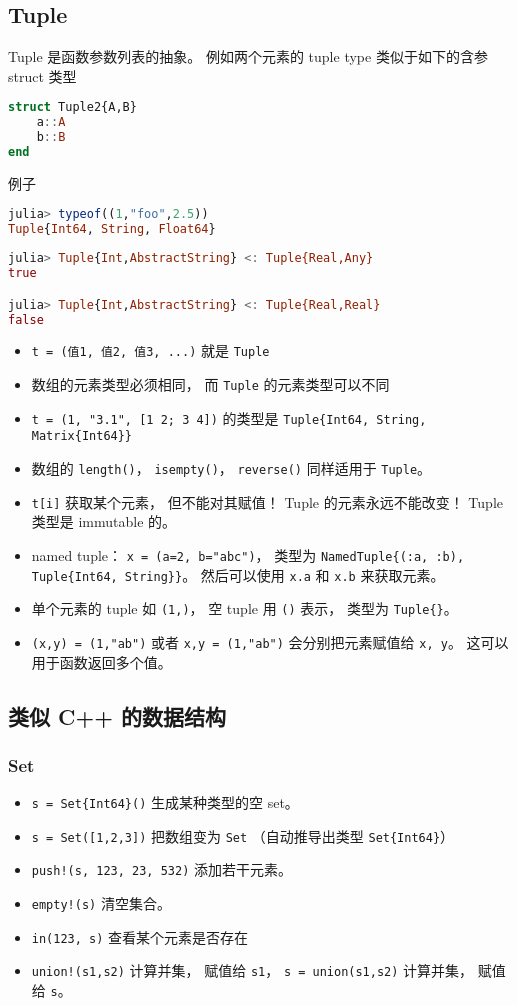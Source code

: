 \subsection{Tuple}
Tuple 是函数参数列表的抽象。 例如两个元素的 tuple type 类似于如下的含参 struct 类型
\begin{lstlisting}[language=julia]
struct Tuple2{A,B}
    a::A
    b::B
end
\end{lstlisting}
例子
\begin{lstlisting}[language=julia]
julia> typeof((1,"foo",2.5))
Tuple{Int64, String, Float64}
\end{lstlisting}
\begin{lstlisting}[language=julia]
julia> Tuple{Int,AbstractString} <: Tuple{Real,Any}
true

julia> Tuple{Int,AbstractString} <: Tuple{Real,Real}
false
\end{lstlisting}

\begin{itemize}
\item \verb`t = (值1, 值2, 值3, ...)` 就是 \verb`Tuple`
\item 数组的元素类型必须相同， 而 \verb`Tuple` 的元素类型可以不同
\item \verb`t = (1, "3.1", [1 2; 3 4])` 的类型是 \verb`Tuple{Int64, String, Matrix{Int64}}`
\item 数组的 \verb`length()`， \verb`isempty()`， \verb`reverse()` 同样适用于 \verb`Tuple`。
\item \verb`t[i]` 获取某个元素， 但不能对其赋值！ Tuple 的元素永远不能改变！ Tuple 类型是 immutable 的。
\item named tuple： \verb`x = (a=2, b="abc")`， 类型为 \verb`NamedTuple{(:a, :b), Tuple{Int64, String}}`。 然后可以使用 \verb`x.a` 和 \verb`x.b` 来获取元素。
\item 单个元素的 tuple 如 \verb`(1,)`， 空 tuple 用 \verb`()` 表示， 类型为 \verb`Tuple{}`。
\item \verb`(x,y) = (1,"ab")` 或者 \verb`x,y = (1,"ab")` 会分别把元素赋值给 \verb`x, y`。 这可以用于函数返回多个值。
\end{itemize}

\subsection{类似 C++ 的数据结构}
\subsubsection{Set}
\begin{itemize}
\item \verb`s = Set{Int64}()` 生成某种类型的空 set。
\item \verb`s = Set([1,2,3])` 把数组变为 \verb`Set` （自动推导出类型 \verb`Set{Int64}`）
\item \verb`push!(s, 123, 23, 532)` 添加若干元素。
\item \verb`empty!(s)` 清空集合。
\item \verb`in(123, s)` 查看某个元素是否存在
\item \verb`union!(s1,s2)` 计算并集， 赋值给 \verb`s1`， \verb`s = union(s1,s2)` 计算并集， 赋值给 \verb`s`。
\end{itemize}

